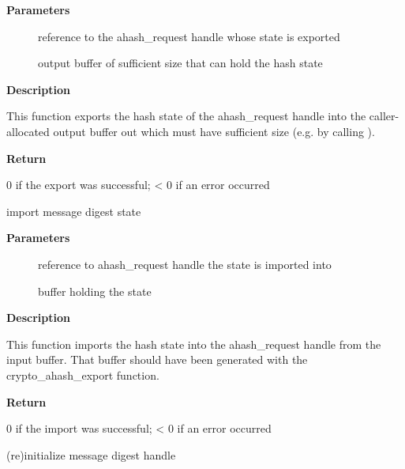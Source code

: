 \documentclass[a4paper,8pt,english]{sphinxmanual}
\begin{document}
\textbf{Parameters}
\begin{description}
\item[{}] \leavevmode
reference to the ahash\_request handle whose state is exported

\item[{}] \leavevmode
output buffer of sufficient size that can hold the hash state

\end{description}

\textbf{Description}

This function exports the hash state of the ahash\_request handle into the
caller-allocated output buffer out which must have sufficient size (e.g. by
calling {\hyperref[crypto/api\string-digest:c.crypto_ahash_statesize]{\emph{}}}).

\textbf{Return}

0 if the export was successful; \textless{} 0 if an error occurred

\begin{fulllineitems}
\label{crypto/api-digest:c.crypto_ahash_import}
import message digest state

\end{fulllineitems}


\textbf{Parameters}
\begin{description}
\item[{}] \leavevmode
reference to ahash\_request handle the state is imported into

\item[{}] \leavevmode
buffer holding the state

\end{description}

\textbf{Description}

This function imports the hash state into the ahash\_request handle from the
input buffer. That buffer should have been generated with the
crypto\_ahash\_export function.

\textbf{Return}

0 if the import was successful; \textless{} 0 if an error occurred

\begin{fulllineitems}
\label{crypto/api-digest:c.crypto_ahash_init}
(re)initialize message digest handle

\end{fulllineitems}
\end{document}
